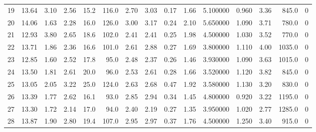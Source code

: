\documentclass{article}
\begin{document}
\begin{tabular}{lrrrrrrrrrrrrrr}
    19  &    13.64 &        3.10 &  2.56 &               15.2 &      116.0 &           2.70 &        3.03 &                  0.17 &             1.66 &         5.100000 &  0.960 &                          3.36 &    845.0 &      0 \\
    20  &    14.06 &        1.63 &  2.28 &               16.0 &      126.0 &           3.00 &        3.17 &                  0.24 &             2.10 &         5.650000 &  1.090 &                          3.71 &    780.0 &      0 \\
    21  &    12.93 &        3.80 &  2.65 &               18.6 &      102.0 &           2.41 &        2.41 &                  0.25 &             1.98 &         4.500000 &  1.030 &                          3.52 &    770.0 &      0 \\
    22  &    13.71 &        1.86 &  2.36 &               16.6 &      101.0 &           2.61 &        2.88 &                  0.27 &             1.69 &         3.800000 &  1.110 &                          4.00 &   1035.0 &      0 \\
    23  &    12.85 &        1.60 &  2.52 &               17.8 &       95.0 &           2.48 &        2.37 &                  0.26 &             1.46 &         3.930000 &  1.090 &                          3.63 &   1015.0 &      0 \\
    24  &    13.50 &        1.81 &  2.61 &               20.0 &       96.0 &           2.53 &        2.61 &                  0.28 &             1.66 &         3.520000 &  1.120 &                          3.82 &    845.0 &      0 \\
    25  &    13.05 &        2.05 &  3.22 &               25.0 &      124.0 &           2.63 &        2.68 &                  0.47 &             1.92 &         3.580000 &  1.130 &                          3.20 &    830.0 &      0 \\
    26  &    13.39 &        1.77 &  2.62 &               16.1 &       93.0 &           2.85 &        2.94 &                  0.34 &             1.45 &         4.800000 &  0.920 &                          3.22 &   1195.0 &      0 \\
    27  &    13.30 &        1.72 &  2.14 &               17.0 &       94.0 &           2.40 &        2.19 &                  0.27 &             1.35 &         3.950000 &  1.020 &                          2.77 &   1285.0 &      0 \\
    28  &    13.87 &        1.90 &  2.80 &               19.4 &      107.0 &           2.95 &        2.97 &                  0.37 &             1.76 &         4.500000 &  1.250 &                          3.40 &    915.0 &      0 \\

\end{tabular}
\end{document}
